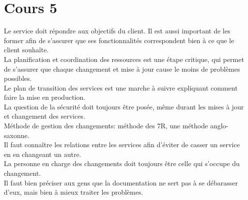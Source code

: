 \section{Cours 5}
Le service doit r\'epondre aux objectifs du client. Il est aussi important de les former afin de s'assurer que ses
fonctionnalit\'es correspondent bien \`a ce que le client souha\^ite.\\
La planification et coordination des ressources est une \'etape critique, qui permet de s'assurer que chaque changement
et mise \`a jour cause le moins de probl\`emes possibles.\\
Le plan de transition des services est une marche \`a suivre expliquant comment faire la mise en production.\\
La question de la s\'ecurit\'e doit toujours \^etre pos\'ee, m\^eme durant les mises \`a jour et changement des
services.\\
M\'ethode de gestion des changements: m\'ethode des 7R, une m\'ethode anglo-saxonne.\\
Il faut conna\^itre les relations entre les services afin d'\'eviter de casser un service en en changeant un autre.\\
La personne en charge des changements doit toujours \^etre celle qui s'occupe du changement.\\
Il faut bien pr\'eciser aux gens que la documentation ne sert pas \`a se d\'ebarasser d'eux, mais bien \`a mieux traiter les
probl\`emes.
